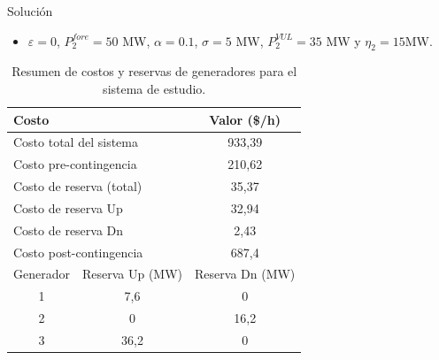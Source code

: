 \begin{frame}{Solución}
\begin{itemize}
    \item $\varepsilon = 0$, $P^{fore}_{2} = 50$ MW, $\alpha = 0.1$, $\sigma = 5$ MW, $P^{VUL}_{2} = 35$ MW y $\eta_{2} = 15$MW.
\end{itemize}

\small
\begin{table}[H]
	\renewcommand{\arraystretch}{1.3}
	\centering
	\caption{Resumen de costos y reservas de generadores para el sistema de estudio.}
	\label{tab:res_ctos}
	\begin{tabular}{|c|c|c|}
		\hline
		\multicolumn{2}{|l|}{Costo} & Valor (\$/h) \\
		\hline
		\multicolumn{2}{|l|}{Costo total del sistema} & 933,39 \\
		\multicolumn{2}{|l|}{Costo pre-contingencia} & 210,62 \\
		\multicolumn{2}{|l|}{Costo de reserva (total)} & 35,37 \\
		\multicolumn{2}{|l|}{Costo de reserva Up} & 32,94 \\
		\multicolumn{2}{|l|}{Costo de reserva Dn} & 2,43 \\
		\multicolumn{2}{|l|}{Costo post-contingencia} & 687,4 \\
		\hline \hline
		Generador & Reserva Up (MW) & Reserva Dn (MW) \\
		\hline
		1 & 7,6 & 0 \\
		2 & 0 & 16,2 \\
		3 & 36,2 & 0 \\
		\hline
	\end{tabular}
\end{table}
\end{frame}

